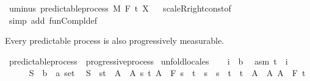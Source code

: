 \begin{isabellebody}
%
\endisadelimproof
\isanewline
{}\isamarkupfalse%
\ uminus{\isacharcolon}{\kern0pt}\ {\isachardoublequoteopen}predictable{\isacharunderscore}{\kern0pt}process\ M\ F\ t\ {\isacharparenleft}{\kern0pt}{\isacharminus}{\kern0pt}X{\isacharparenright}{\kern0pt}{\isachardoublequoteclose}%
\isadelimproof
\ %
\endisadelimproof
%
\isatagproof
{}\isamarkupfalse%
\ scaleR{\isacharunderscore}{\kern0pt}right{\isacharunderscore}{\kern0pt}const{\isacharprime}{\kern0pt}{\isacharbrackleft}{\kern0pt}of\ {\isachardoublequoteopen}{\isacharminus}{\kern0pt}{}{\isachardoublequoteclose}{\isacharbrackright}{\kern0pt}\ \isamarkupfalse%
\ {\isacharparenleft}{\kern0pt}simp\ add{\isacharcolon}{\kern0pt}\ fun{\isacharunderscore}{\kern0pt}Compl{\isacharunderscore}{\kern0pt}def{\isacharparenright}{\kern0pt}%
\endisatagproof
{\isafoldproof}%
%
\isadelimproof
%
\endisadelimproof
\isanewline
\isanewline
{}\isamarkupfalse%
%
\begin{isamarkuptext}%
Every predictable process is also progressively measurable.%
\end{isamarkuptext}\isamarkuptrue%
\isamarkupfalse%
\ predictable{\isacharunderscore}{\kern0pt}process\ {\isasymsubseteq}\ progressive{\isacharunderscore}{\kern0pt}process\isanewline
%
\isadelimproof
%
\endisadelimproof
%
\isatagproof
{}\isamarkupfalse%
\ {\isacharparenleft}{\kern0pt}unfold{\isacharunderscore}{\kern0pt}locales{\isacharparenright}{\kern0pt}\isanewline
\ \ \isamarkupfalse%
\ i\ {\isacharcolon}{\kern0pt}{\isacharcolon}{\kern0pt}\ {\isacharprime}{\kern0pt}b\ \isamarkupfalse%
\ asm{\isacharcolon}{\kern0pt}\ {\isachardoublequoteopen}t\ {\isasymle}\ i{\isachardoublequoteclose}\isanewline
\ \ \isacommand{{\isacharbraceleft}{\kern0pt}}\isamarkupfalse%
\isanewline
\ \ \ \ \isamarkupfalse%
\ S\ {\isacharcolon}{\kern0pt}{\isacharcolon}{\kern0pt}\ {\isachardoublequoteopen}{\isacharparenleft}{\kern0pt}{\isacharprime}{\kern0pt}b\ {\isasymtimes}\ {\isacharprime}{\kern0pt}a{\isacharparenright}{\kern0pt}\ set{\isachardoublequoteclose}\ \isamarkupfalse%
\ {\isachardoublequoteopen}S\ {\isasymin}\ {\isacharbraceleft}{\kern0pt}{\isacharbraceleft}{\kern0pt}s{\isacharless}{\kern0pt}{\isachardot}{\kern0pt}{\isachardot}{\kern0pt}t{\isacharbraceright}{\kern0pt}\ {\isasymtimes}\ A\ {\isacharbar}{\kern0pt}\ A\ s\ t{\isachardot}{\kern0pt}\ A\ {\isasymin}\ F\ s\ {\isasymand}\ t\ {\isasymle}\ s\ {\isasymand}\ s\ {\isacharless}{\kern0pt}\ t{\isacharbraceright}{\kern0pt}\ {\isasymunion}\ {\isacharbraceleft}{\kern0pt}{\isacharbraceleft}{\kern0pt}t\ {\isasymtimes}\ A\ {\isacharbar}{\kern0pt}\ A{\isachardot}{\kern0pt}\ A\ {\isasymin}\ F\ t\isanewline

\end{isabellebody}
